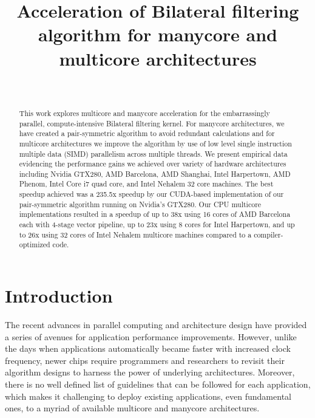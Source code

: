 \documentclass{IEEEtran}
\begin{document}
\title{Acceleration of Bilateral filtering algorithm for manycore and multicore architectures}
\author{\\
}
\maketitle
\begin{abstract}
This work explores multicore and manycore acceleration for the embarrassingly parallel, compute-intensive Bilateral filtering kernel. For manycore architectures, we have created a pair-symmetric algorithm to avoid redundant calculations and for multicore architectures we improve the algorithm by use of low level single instruction multiple data (SIMD) parallelism across multiple threads. We present empirical data evidencing the performance gains we achieved over variety of hardware architectures including Nvidia GTX280, AMD Barcelona, AMD Shanghai, Intel Harpertown, AMD Phenom, Intel Core i7 quad core, and Intel Nehalem 32 core machines. The best speedup achieved was a 235.5x speedup by our CUDA-based implementation of our pair-symmetric algorithm running on Nvidia's GTX280. Our CPU multicore implementations resulted in a speedup of up to 38x using 16 cores of AMD Barcelona each with 4-stage vector pipeline, up to 23x using 8 cores for Intel Harpertown, and up to 26x using 32 cores of Intel Nehalem multicore machines compared to a compiler-optimized code.
\end{abstract}
\IEEEpeerreviewmaketitle
\section{Introduction}
\label{sec:intro} The recent advances in parallel computing and architecture design have provided a series of avenues for application performance improvements. However, unlike the days when applications automatically became faster with increased clock frequency, newer chips require programmers and researchers to revisit their algorithm designs to harness the power of underlying architectures. Moreover, there is no well defined list of guidelines that can be followed for each application, which makes it challenging to deploy existing applications, even fundamental ones, to a myriad of available multicore and manycore architectures.
\end{document}
